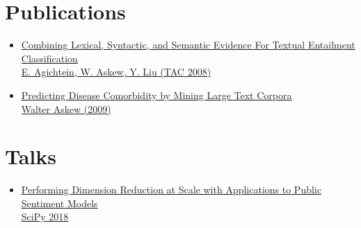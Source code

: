 \documentclass[letterpaper,10pt]{article}
\begin{document}
\section{Publications}
  \begin{itemize}[leftmargin=*]
    \item[]
      \href{http://www.nist.gov/tac/publications/2008/participant.papers/Emory.proceedings.pdf}
           {Combining Lexical, Syntactic, and Semantic Evidence For
             Textual Entailment Classification\\
             E. Agichtein, W. Askew, Y. Liu (TAC 2008)}
    \item[]
      \href{https://etd.library.emory.edu/concern/etds/736664895}
           {Predicting Disease Comorbidity by Mining Large Text
             Corpora\\
             Walter Askew (2009)}
  \end{itemize}

\section{Talks}
  \begin{itemize}[leftmargin=*]
    \item[]
      \href{https://www.youtube.com/watch?v=31YeSfDklfc}
           {Performing Dimension Reduction at Scale with Applications
             to Public Sentiment Models\\
             SciPy 2018}
  \end{itemize}
\end{document}
